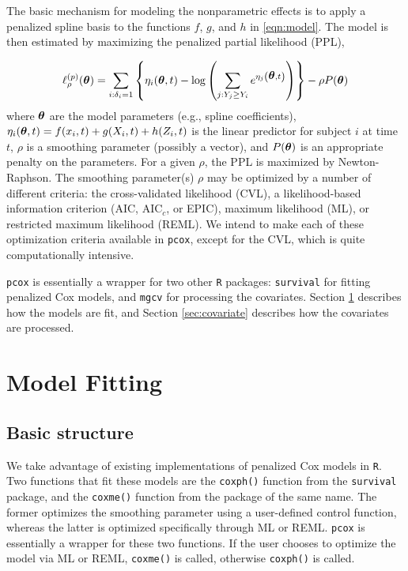 \documentclass[12pt]{article}
\newcommand{\btheta}{\mbox{\boldmath $\theta$}}
\newcommand{\beq}{\begin{equation}}
\newcommand{\eeq}{\end{equation}}
\newcommand{\beqa}{\begin{eqnarray*}}
\newcommand{\eeqa}{\end{eqnarray*}}
\begin{document}
The basic mechanism for modeling the nonparametric effects is to apply a penalized spline
basis to the functions $f$, $g$, and $h$ in \eqref{eqn:model}. The model is then estimated by
maximizing the penalized partial likelihood (PPL), 

\beq
	\ell^{(p)}_{\rho}(\btheta) = \sum_{i:\delta_i=1}\left\{ \eta_i(\btheta,t) -
		\log\left(\sum_{j: Y_j\geq Y_i}e^{\eta_j\left(\btheta,t\right)}\right)\right\} - \rho P(\btheta)
\eeq
where $\btheta$ are the model parameters (e.g., spline coefficients), $\eta_i(\btheta,t) = f(x_i,t) + g(X_i,t) + h(Z_i,t)$
is the linear predictor for subject $i$ at time $t$, $\rho$ is a smoothing parameter (possibly a vector),
and $P(\btheta)$ is an appropriate penalty on the parameters. For a given $\rho$, the PPL is maximized
by Newton-Raphson. The smoothing parameter(s) $\rho$ may be optimized by a number of different criteria: 
the cross-validated likelihood (CVL), a likelihood-based information criterion (AIC, AIC$_c$, or EPIC), maximum
likelihood (ML), or restricted maximum likelihood (REML). We intend to make each of these optimization criteria
available in \texttt{pcox}, except for the CVL, which is quite computationally intensive.

\texttt{pcox} is essentially a wrapper for two other \texttt{R} packages: \texttt{survival} for
fitting penalized Cox models, and \texttt{mgcv} for processing the covariates. Section
\ref{sec:fitting} describes how the models are fit, and Section \ref{sec:covariate} describes how the
covariates are processed.


\section{Model Fitting} \label{sec:fitting}

\subsection{Basic structure}

We take advantage of existing implementations of penalized Cox models in \texttt{R}. Two functions that fit these
models are the \texttt{coxph()} function from the \texttt{survival} package, and the \texttt{coxme()} function from the package
of the same name. The former optimizes the smoothing parameter using a user-defined control function, whereas
the latter is optimized specifically through ML or REML. \texttt{pcox} is essentially a wrapper for these two functions.
If the user chooses to optimize the model via ML or REML, \texttt{coxme()} is called, otherwise \texttt{coxph()} is
called.
\end{document}
